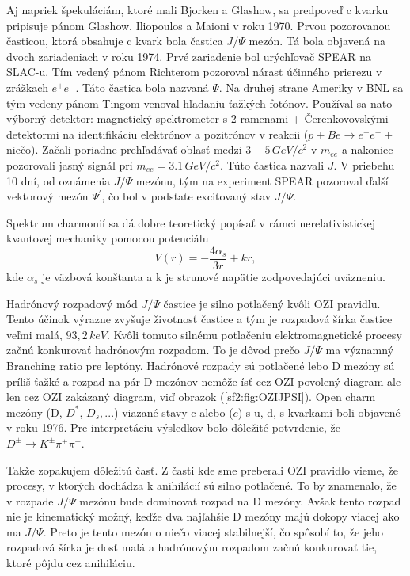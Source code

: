 \documentclass[../../main.tex]{subfiles}
\begin{document}
Aj napriek špekuláciám, ktoré mali Bjorken a Glashow, sa predpoveď c kvarku pripisuje pánom Glashow, Iliopoulos a Maioni v roku 1970. Prvou pozorovanou časticou, ktorá obsahuje c kvark bola častica $J/\Psi$ mezón. Tá bola objavená na dvoch zariadeniach v roku 1974. Prvé zariadenie bol urýchľovač SPEAR na SLAC-u. Tím vedený pánom Richterom pozoroval nárast účinného prierezu v zrážkach $e^+e^-$. Táto častica bola nazvaná $\Psi$. Na druhej strane Ameriky v BNL sa tým vedeny pánom Tingom venoval hľadaniu ťažkých fotónov. Používal sa nato výborný detektor: magnetický spektrometer s 2 ramenami + Čerenkovovskými detektormi na identifikáciu elektrónov a pozitrónov v reakcii ($p+Be \rightarrow e^+e^- + $niečo). Začali poriadne prehľadávať oblasť medzi $3-5\,GeV/c^2$ v $m_{ee}$ a nakoniec pozorovali jasný signál pri $m_{ee}=3.1\,GeV/c^2$. Túto častica nazvali $J$. V priebehu 10 dní, od oznámenia $J/\Psi$ mezónu, tým na experiment SPEAR pozoroval ďalší vektorový mezón $\Psi^{\prime}$, čo bol v podstate excitovaný stav $J/\Psi$.

Spektrum charmonií sa dá dobre teoretický popísať v rámci nerelativistickej kvantovej mechaniky pomocou potenciálu $$ V(r)=-\frac{4\alpha_s}{3r}+kr,$$ kde $\alpha_s$ je väzbová konštanta a k je strunové napätie zodpovedajúci uväzneniu.

Hadrónový rozpadový mód $J/\Psi$ častice je silno potlačený kvôli OZI pravidlu. Tento účinok výrazne zvyšuje životnosť častice a tým je rozpadová šírka častice veľmi malá, $93,2\,\unit{keV}$. Kvôli tomuto silnému potlačeniu elektromagnetické procesy začnú konkurovať hadrónovým rozpadom. To je dôvod prečo $J/\Psi$ ma významný Branching ratio pre leptóny. Hadrónové rozpady sú potlačené lebo D mezóny sú príliš ťažké a rozpad na pár D mezónov nemôže ísť cez OZI povolený diagram ale len cez OZI zakázaný diagram, viď obrazok (\ref{sf2:fig:OZIJPSI}). Open charm mezóny (D, $D^*$, $D_s,...$) viazané stavy c alebo ($\bar{c}$) s u, d, s kvarkami boli objavené v roku 1976. Pre interpretáciu výsledkov bolo dôležité potvrdenie, že $D^{\pm} \rightarrow K^{\pm} \pi^+ \pi^-$.

Takže zopakujem dôležitú časť. Z časti kde sme preberali OZI pravidlo vieme, že procesy, v ktorých dochádza k anihilácií sú silno potlačené. To by znamenalo, že v rozpade $J/\Psi$ mezónu bude dominovať rozpad na D mezóny. Avšak tento rozpad nie je kinematický možný, keďže dva najľahšie D mezóny majú dokopy viacej ako ma $J/\Psi$. Preto je tento mezón o niečo viacej stabilnejší, čo spôsobí to, že jeho rozpadová šírka je dosť malá a hadrónovým rozpadom začnú konkurovať tie, ktoré pôjdu cez anihiláciu.
\end{document}
